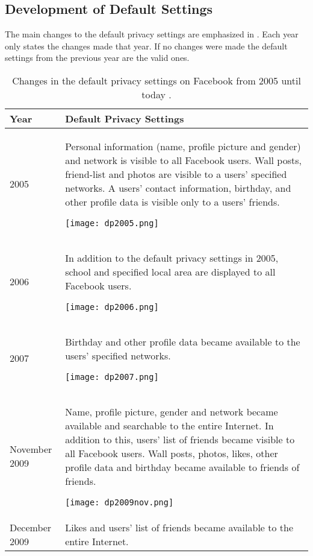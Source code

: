 \subsection{Development of Default Settings}




The main changes to the default privacy settings are emphasized in . Each year only states the changes made that year. If no changes were made the default settings from the previous year are the valid ones. 

\begin{center}
\begin{longtable}{ | l | p{9cm} |}
\caption{\label{tab:dps}Changes in the default privacy settings on Facebook from 2005 until today \cite{EvoPriv,PrivTimeline}.}\\
    \hline
    \textbf{Year} & \textbf{Default Privacy Settings} \\ 
    \hline
    2005 & Personal information (name, profile picture and gender) and network is visible to all Facebook users. Wall posts, friend-list and photos are visible to a users' specified networks. A users' contact information, birthday, and other profile data is visible only to a users' friends. 
    
    \texttt{[image: dp2005.png]}\\ 
    \hline
    2006 & In addition to the default privacy settings in 2005, school and specified local area are displayed to all Facebook users.  
    
    \texttt{[image: dp2006.png]} \\ 
    \hline
    2007 & Birthday and other profile data became available to the users' specified networks. 
    
    \texttt{[image: dp2007.png]}\\
    \hline
    November 2009 & Name, profile picture, gender and network became 			available and searchable to the entire Internet. In addition to this, users' list of friends became visible to all Facebook users. Wall posts, photos, likes, other profile data and birthday became available to friends of friends. 
    
    \texttt{[image: dp2009nov.png]}\\
	\hline
    December 2009 & Likes and users' list of friends became available to the entire Internet. 
    

\end{longtable}
\end{center}

